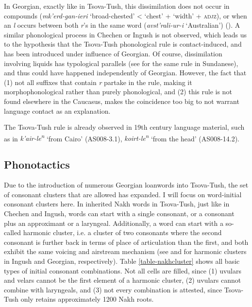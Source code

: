 In Georgian, exactly like in Tsova-Tush, this dissimilation does not occur in compounds (\textit{mk'erd-gan-ieri} `broad-chested' < `chest' + `width' + \textsc{adjz}),
or when an \textit{l} occurs between both \textit{r}'s in the same word (\textit{avst'rali-ur-i} `Australian') (\cites[24]{shanidze53sapudz}). A similar phonological process in Chechen or Ingush is not observed, which leads us to the hypothesis that the Tsova-Tush phonological rule is contact-induced, and has been introduced under influence of Georgian. Of course, dissimilation involving liquids has typological parallels (see \textcite{cohn1992dissimilation} for the same rule in Sundanese), and thus could have happened independently of Georgian. However, the fact that (1) not all suffixes that contain \textit{r} partake in the rule, making it morphophonological rather than purely phonological, and (2) this rule is not found elsewhere in the Caucasus, makes the coincidence too big to not warrant language contact as an explanation.

The Tsova-Tush rule is already observed in 19th century language material, such as in \textit{k'air-le\textsuperscript{n}} `from Cairo' (AS008-3.1), \textit{koirt-le\textsuperscript{n}} `from the head' (AS008-14.2).


\subsection{Phonotactics} \label{phonotact}
Due to the introduction of numerous Georgian loanwords into Tsova-Tush, the set of consonant clusters that are allowed has expanded. I will focus on word-initial consonant clusters here. In inherited Nakh words in Tsova-Tush, just like in Chechen and Ingush, words can start with a single consonant, or a consonant plus an approximant or a laryngeal. Additionally, a word can start with a so-called harmonic cluster, i.e. a cluster of two consonants where the second consonant is further back in terms of place of articulation than the first, and both exhibit the same voicing and airstream mechanism (see \cites[86--87]{nichols11} and \cites[223]{aronson91} for harmonic clusters in Ingush and Georgian, respectively). Table \ref{table-nakhcluster} shows all basic types of initial consonant combinations. Not all cells are filled, since (1) uvulars and velars cannot be the first element of a harmonic cluster, (2) uvulars cannot combine with laryngeals, and (3) not every combination is attested, since Tsova-Tush only retains approximately 1200 Nakh roots.

